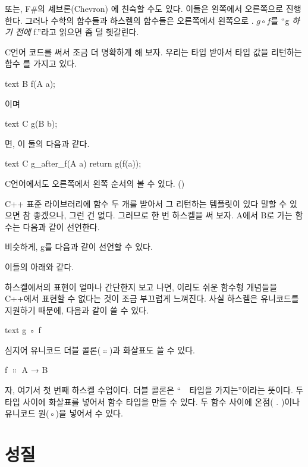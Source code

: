 또는, F\#의 셰브론(Chevron) \code{>>}에 친숙할 수도 있다. 이들은 왼쪽에서 오른쪽으로 진행한다.
그러나 수학의 함수들과 하스켈의 함수들은 오른쪽에서 왼쪽으로 .
$g \circ f$를 ``g \emph{하기 전에} f.''라고 읽으면 좀 덜 헷갈린다.

C언어 코드를 써서 조금 더 명확하게 해 보자. 
우리는 타입 \trArgument\를 받아서 타입 값을 리턴하는 함수 를 가지고 있다.

\begin{snip}{text}
B f(A a);
\end{snip}
이며

\begin{snip}{text}
C g(B b);
\end{snip}
면, 이 둘의 \trComposition\은 다음과 같다.

\begin{snip}{text}
C g_after_f(A a)
{
    return g(f(a));
}
\end{snip}
C언어에서도 오른쪽에서 왼쪽 순서의 \trComposition\을 볼 수 있다. ()

C++ 표준 라이브러리에 함수 두 개를 받아서 그 \trComposition\을 리턴하는 템플릿이 있다 말할 수 있으면 참 좋겠으나, 그런 건 없다.
그러므로 한 번 하스켈을 써 보자. A에서 B로 가는 함수는 다음과 같이 선언한다.

비슷하게, g를 다음과 같이 선언할 수 있다.

이들의 \trComposition\은 아래와 같다.

하스켈에서의 표현이 얼마나 간단한지 보고 나면, 이리도 쉬운 함수형 개념들을 C++에서 표현할 수 없다는 것이 조금 부끄럽게 느껴진다.
사실 하스켈은 유니코드를 지원하기 때문에, \trComposition\을 다음과 같이 쓸 수 있다.
\begin{snip}{text}
g ◦ f
\end{snip}

심지어 유니코드 더블 콜론($\ensuremath{\Colon}$)과 화살표도 쓸 수 있다.
\begin{snipv}
f \ensuremath{\Colon} A → B
\end{snipv}
자, 여기서 첫 번째 하스켈 수업이다. 
더블 콜론은 ``~~타입을 가지는''이라는 뜻이다.
두 타입 사이에 화살표를 넣어서 함수 타입을 만들 수 있다.
두 함수 사이에 온점( . )이나 유니코드 원(◦)을 넣어서  수 있다.

\section{ 성질}

